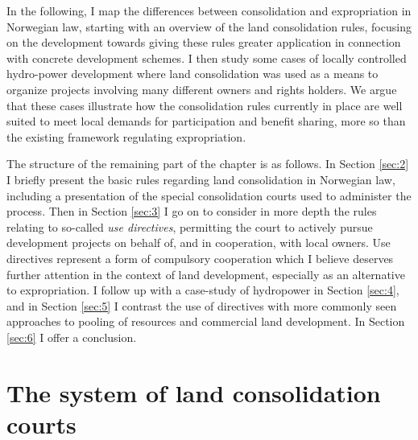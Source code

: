 {In the following, I map the differences between consolidation and expropriation in Norwegian law, starting with an overview of the land consolidation rules, focusing on the development towards giving these rules greater application in connection with concrete development schemes. I then study some cases of locally controlled hydro-power development where land consolidation was used as a means to organize projects involving many different owners and rights holders. We argue that these cases illustrate how the consolidation rules currently in place are well suited to meet local demands for participation and benefit sharing, more so than the existing framework regulating expropriation.

The structure of the remaining part of the chapter is as follows. In Section \ref{sec:2} I briefly present the basic rules regarding land consolidation in Norwegian law, including a presentation of the special consolidation courts used to administer the process. Then in Section \ref{sec:3} I go on to consider in more depth the rules relating to so-called \emph{use directives}, permitting the court to actively pursue development projects on behalf of, and in cooperation, with local owners. Use directives represent a form of compulsory cooperation which I believe deserves further attention in the context of land development, especially as an alternative to expropriation. I follow up with a case-study of hydropower in Section \ref{sec:4}, and in Section \ref{sec:5} I contrast the use of directives with more commonly seen approaches to pooling of resources and commercial land development. In Section \ref{sec:6} I offer a conclusion.
}

\section{The system of land consolidation courts}\label{sec:lcc}

